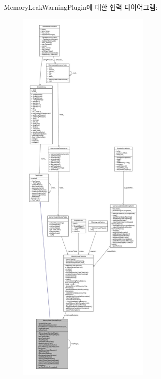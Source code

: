 Memory\+Leak\+Warning\+Plugin에 대한 협력 다이어그램\+:
\nopagebreak
\begin{figure}[H]
\begin{center}
\leavevmode
\includegraphics[height=550pt]{class_memory_leak_warning_plugin__coll__graph}
\end{center}
\end{figure}
